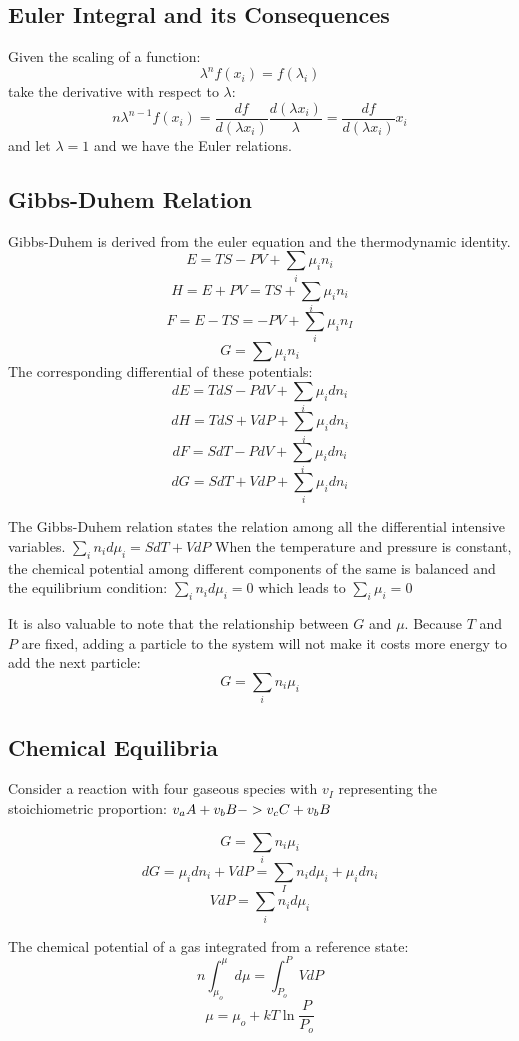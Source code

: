 \documentclass[12pt, oneside]{article}   	%
\begin{document}
\subsection*{Euler Integral and its Consequences}

\par
Given the scaling of a function: 
$$\lambda^n f({x_i}) = f({\lambda_i})$$
take the derivative with respect to $\lambda$: 
$$n\lambda^{n-1} f({x_i}) = \frac{df}{d(\lambda x_i)} \frac{d(\lambda x_i)}{\lambda} = \frac{df}{d(\lambda x_i)} x_i $$
and let $\lambda = 1$ and we have the Euler relations.
\subsection*{Gibbs-Duhem Relation}
\par
Gibbs-Duhem is derived from the euler equation and the thermodynamic identity. 
$$E = TS - PV + \sum_i \mu_i n_i$$
$$H = E + PV = TS + \sum_i \mu_i n_i$$
$$F = E - TS = - PV + \sum_i \mu_i n_I$$
$$G = \sum \mu_i n_i$$
The corresponding differential of these potentials: 
$$dE = TdS - PdV  + \sum_i \mu_i dn_i$$
$$dH = TdS + VdP + \sum_i \mu_i dn_i$$
$$dF = SdT - PdV + \sum_i \mu_i dn_i$$
$$dG = SdT + VdP + \sum_i \mu_i dn_i$$

\par
The Gibbs-Duhem relation states the relation among all the differential intensive variables.
$ \sum_i n_i d \mu_i = S dT + V dP $ 
When the temperature and pressure is constant, the chemical potential among different components of the same is balanced and the equilibrium condition: $\sum_i n_i d\mu_i = 0$ which leads to $\sum_i \mu_i = 0$

\par 
It is also valuable to note that the relationship between $G$ and $\mu$. Because $T$ and $P$ are fixed, adding a particle to the system will not make it costs more energy to add the next particle:
$$G = \sum_i n_i \mu_i$$ 

\subsection{Chemical Equilibria}
Consider a reaction with four gaseous species with $v_I$ representing the stoichiometric proportion: $v_a A + v_b B \--> v_c C + v_b B$ 

$$ G = \sum_i n_i \mu_i $$ 
$$dG  =\mu_i dn_i + V dP = \sum_I n_i d\mu_i + \mu_i dn_i $$
$$VdP = \sum_i  n_i d\mu_i$$

The chemical potential of a gas integrated from a reference state: 
$$ n \int_{\mu_o}^{\mu} d\mu = \int_{P_o}^{P} VdP $$
$$ \mu = \mu_o + k T \ln \frac{P}{P_o}$$
\end{document}
